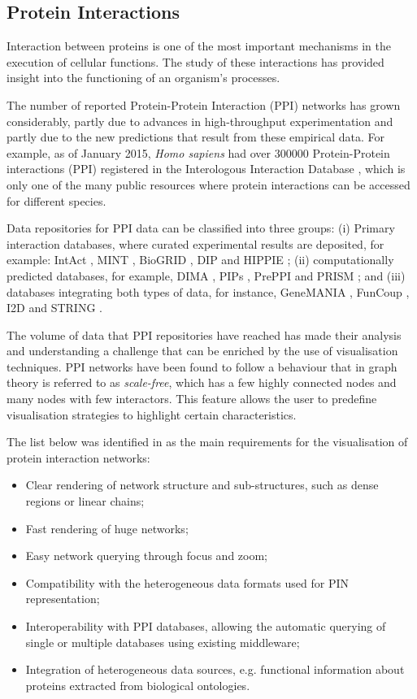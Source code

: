 \subsection{Protein Interactions}
\label{sec:ppi}
Interaction between proteins is one of the most important mechanisms in the execution of cellular functions. The study of these interactions has provided insight into the functioning of an organism's processes.

The number of reported Protein-Protein Interaction (PPI) networks has grown considerably, partly due to advances in high-throughput experimentation and partly due to the new predictions that result from these empirical data. For example, as of January 2015, \emph{Homo sapiens} had over 300000 Protein-Protein interactions (PPI) registered in the Interologous Interaction Database \cite{NIU2010}, which is only one of the many public resources where protein interactions can be accessed for different species. 

Data repositories for PPI data can be classified into three groups: (i) Primary interaction databases, where curated experimental results are deposited, for example: IntAct \cite{KER2012}, MINT \cite{LIC2012}, BioGRID \cite{STA2006}, DIP \cite{SAL2004} and HIPPIE \cite{SCH2012}; (ii) computationally predicted databases, for example, DIMA \cite{LUO2011}, PIPs \cite{MCD2009}, PrePPI \cite{ZHA2012} and PRISM \cite{OGM2005}; and (iii) databases integrating both types of data, for instance, GeneMANIA \cite{WAR2010}, FunCoup \cite{SCH2014}, I2D \cite{NIU2010} and STRING \cite{SZK2014}.

The volume of data that PPI repositories have reached has made their analysis and understanding a challenge that can be enriched by the use of visualisation techniques. PPI networks have been found to follow a behaviour that in graph theory is referred to as \emph{scale-free}, which has a few highly connected nodes and many nodes with few interactors. This feature allows the user to predefine visualisation strategies to highlight certain characteristics.

The list below was identified in \cite{AGA2013} as the main requirements for the visualisation of protein interaction networks:
\begin{itemize}
\setlength\itemsep{-0.3em}
        \item Clear rendering of network structure and sub-structures, such as dense regions or linear chains;
        \item Fast rendering of huge networks;
        \item Easy network querying through focus and zoom;
        \item Compatibility with the heterogeneous data formats used for PIN representation;
        \item Interoperability with PPI databases, allowing the automatic querying of single or multiple databases using existing middleware;
        \item Integration of heterogeneous data sources, e.g. functional information about proteins extracted from biological ontologies.
\end{itemize}

